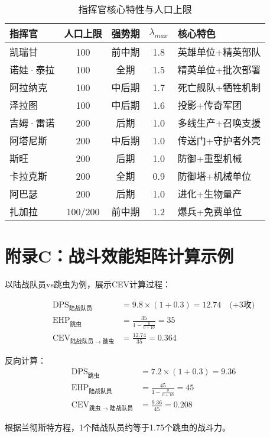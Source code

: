 \documentclass[a4paper,12pt]{article}
\begin{document}
\begin{table}[h]
\centering
\caption{指挥官核心特性与人口上限}
\small
\begin{tabular}{lcccl}
\toprule
\textbf{指挥官} & \textbf{人口上限} & \textbf{强势期} & \textbf{$\lambda_{max}$} & \textbf{核心特色} \\
\midrule
凯瑞甘 & 100 & 前中期 & 1.8 & 英雄单位+精英部队 \\
诺娃·泰拉 & 100 & 全期 & 1.5 & 精英单位+批次部署 \\
阿拉纳克 & 100 & 中后期 & 1.7 & 死亡舰队+牺牲机制 \\
泽拉图 & 100 & 中后期 & 1.6 & 投影+传奇军团 \\
吉姆·雷诺 & 200 & 后期 & 1.0 & 多线生产+召唤支援 \\
阿塔尼斯 & 200 & 中后期 & 1.0 & 传送门+守护者外壳 \\
斯旺 & 200 & 后期 & 1.0 & 防御+重型机械 \\
卡拉克斯 & 200 & 全期 & 0.9 & 防御塔+机械单位 \\
阿巴瑟 & 200 & 后期 & 1.0 & 进化+生物量产 \\
扎加拉 & 100/200 & 前中期 & 1.2 & 爆兵+免费单位 \\
\bottomrule
\end{tabular}
\end{table}

\section{附录C：战斗效能矩阵计算示例}

以陆战队员vs跳虫为例，展示CEV计算过程：

\begin{align}
\text{DPS}_{陆战队员} &= 9.8 \times (1 + 0.3) = 12.74 \quad \text{(+3攻)} \\
\text{EHP}_{跳虫} &= \frac{35}{1 - \frac{0}{0 + 10}} = 35 \\
\text{CEV}_{陆战队员 \rightarrow 跳虫} &= \frac{12.74}{35} = 0.364
\end{align}

反向计算：
\begin{align}
\text{DPS}_{跳虫} &= 7.2 \times (1 + 0.3) = 9.36 \\
\text{EHP}_{陆战队员} &= \frac{45}{1 - \frac{0}{0 + 10}} = 45 \\
\text{CEV}_{跳虫 \rightarrow 陆战队员} &= \frac{9.36}{45} = 0.208
\end{align}

根据兰彻斯特方程，1个陆战队员约等于1.75个跳虫的战斗力。
\end{document}
